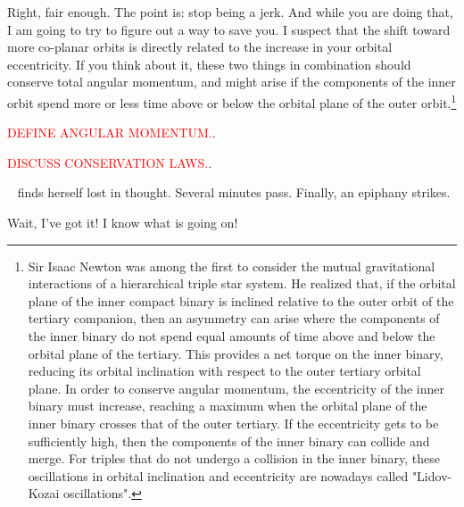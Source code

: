 \documentclass[main.tex]{subfiles}
\begin{document}
\par \Celaeno Right, fair enough.  The point is:  stop being a jerk.  And while you are doing that, I am going to try to figure out a way to save you.  I suspect that the shift toward more co-planar orbits is directly related to the increase in your orbital eccentricity.  If you think about it, these two things in combination should conserve total angular momentum, and might arise if the components of the inner orbit spend more or less time above or below the orbital plane of the outer orbit.\footnote{Sir Isaac Newton was among the first to consider the mutual gravitational interactions of a hierarchical triple star system.  He realized that, if the orbital plane of the inner compact binary is inclined relative to the outer orbit of the tertiary companion, then an asymmetry can arise where the components of the inner binary do not spend equal amounts of time above and below the orbital plane of the tertiary.  This provides a net torque on the inner binary, reducing its orbital inclination with respect to the outer tertiary orbital plane.  In order to conserve angular momentum, the eccentricity of the inner binary must increase, reaching a maximum when the orbital plane of the inner binary crosses that of the outer tertiary.  If the eccentricity gets to be sufficiently high, then the components of the inner binary can collide and merge.  For triples that do not undergo a collision in the inner binary, these oscillations in orbital inclination and eccentricity are nowadays called "Lidov-Kozai oscillations".} 

\begin{tcolorbox}[sharp corners, colback=red!30, colframe=red!80!blue, title=Angular Momentum]
\par \textcolor{red}{DEFINE ANGULAR MOMENTUM.}. 
\end{tcolorbox}

\begin{tcolorbox}[sharp corners, colback=red!30, colframe=red!80!blue, title=Conservation of Energy and Angular Momentum]
\par \textcolor{red}{DISCUSS CONSERVATION LAWS.}.  
\end{tcolorbox}

\par \nar \rmcelaeno~ finds herself lost in thought.  Several minutes pass.  Finally, an epiphany strikes.

\par \Celaeno  Wait, I've got it!  I know what is going on!
\end{document}
